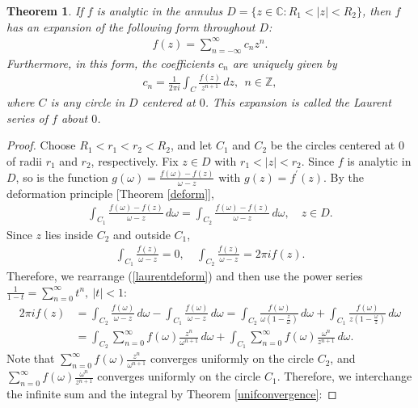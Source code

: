 \documentclass{article}
\numberwithin{equation}{section}
\newcommand{\bbC}{\mathbb{C}}
\newcommand{\bbZ}{\mathbb{Z}}
\theoremstyle{plain}
\newtheorem{theorem}{Theorem}[section]
\theoremstyle{definition}
\begin{document}
\begin{theorem}
If $f$ is analytic in the annulus $D=\{z\in\bbC:R_1<\vert z\vert<R_2\}$, then $f$ has an expansion of the following form throughout $D$:
\begin{align}
	f(z)=\sum_{n=-\infty}^\infty c_nz^n.\label{laurentexp}
\end{align}
Furthermore, in this form, the coefficients $c_n$ are uniquely given by
\begin{align*}
	c_n=\frac{1}{2\pi i}\int_C\frac{f(z)}{z^{n+1}}\,dz,\ \ n\in\bbZ,
\end{align*}
where $C$ is any circle in $D$ centered at $0$. This expansion is called the \textit{Laurent series} of $f$ about $0$.
\end{theorem}
\begin{proof}
Choose $R_1<r_1<r_2<R_2$, and let $C_1$ and $C_2$ be the circles centered at $0$ of radii $r_1$ and $r_2$, respectively. Fix $z\in D$ with $r_1<\vert z\vert<r_2$. Since $f$ is analytic in $D$, so is the function $g(\omega)=\frac{f(\omega)-f(z)}{\omega-z}$ with $g(z)=f^\prime(z)$. By the deformation principle [Theorem \ref{deform}],
\begin{align}
	\int_{C_1}\frac{f(\omega)-f(z)}{\omega-z}\,d\omega=\int_{C_2}\frac{f(\omega)-f(z)}{\omega-z}\,d\omega,\quad z\in D.\label{laurentdeform}
\end{align}
Since $z$ lies inside $C_2$ and outside $C_1$,
\begin{align*}
	\int_{C_1}\frac{f(z)}{\omega-z}=0,\quad \int_{C_2}\frac{f(z)}{\omega-z}=2\pi i f(z).
\end{align*}
Therefore, we rearrange (\ref{laurentdeform}) and then use the power series $\frac{1}{1-t}=\sum_{n=0}^\infty t^n,\ \vert t\vert<1$:
\begin{align*}
	2\pi i f(z)&=\int_{C_2}\frac{f(\omega)}{\omega-z}\,d\omega-\int_{C_1}\frac{f(\omega)}{\omega-z}\,d\omega=\int_{C_2}\frac{f(\omega)}{\omega\left(1-\frac{z}{\omega}\right)}\,d\omega+\int_{C_1}\frac{f(\omega)}{z\left(1-\frac{\omega}{z}\right)}\,d\omega\\
	&=\int_{C_2}\sum_{n=0}^\infty f(\omega)\frac{z^n}{\omega^{n+1}}\,d\omega+\int_{C_1}\sum_{n=0}^\infty f(\omega)\frac{\omega^n}{z^{n+1}}\,d\omega.
\end{align*}
Note that $\sum_{n=0}^\infty f(\omega)\frac{z^n}{\omega^{n+1}}$ converges uniformly on the circle $C_2$, and $\sum_{n=0}^\infty f(\omega)\frac{\omega^n}{z^{n+1}}$ converges uniformly on the circle $C_1$. Therefore, we interchange the infinite sum and the integral by Theorem \ref{unifconvergence}:

\end{proof}
\end{document}
